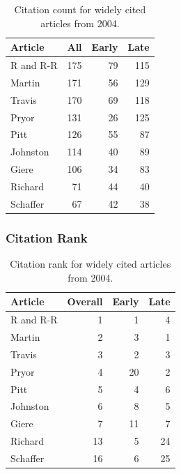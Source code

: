 \documentclass[
  10pt,
  letterpaper,
  DIV=11,
  numbers=noendperiod,
  twoside]{scrartcl}
\begin{document}
\begin{longtable}[]{@{}lrrr@{}}

\caption{\label{tbl-citation-count-2004}Citation count for widely cited
articles from 2004.}

\tabularnewline

\toprule\noalign{}
Article & All & Early & Late \\
\midrule\noalign{}
\endhead
\bottomrule\noalign{}
\endlastfoot
R and R-R & 175 & 79 & 115 \\
Martin & 171 & 56 & 129 \\
Travis & 170 & 69 & 118 \\
Pryor & 131 & 26 & 125 \\
Pitt & 126 & 55 & 87 \\
Johnston & 114 & 40 & 89 \\
Giere & 106 & 34 & 83 \\
Richard & 71 & 44 & 40 \\
Schaffer & 67 & 42 & 38 \\

\end{longtable}

\subsubsection*{Citation Rank}\label{citation-rank-28}

\begin{longtable}[]{@{}lrrr@{}}

\caption{\label{tbl-citation-rank-2004}Citation rank for widely cited
articles from 2004.}

\tabularnewline

\toprule\noalign{}
Article & Overall & Early & Late \\
\midrule\noalign{}
\endhead
\bottomrule\noalign{}
\endlastfoot
R and R-R & 1 & 1 & 4 \\
Martin & 2 & 3 & 1 \\
Travis & 3 & 2 & 3 \\
Pryor & 4 & 20 & 2 \\
Pitt & 5 & 4 & 6 \\
Johnston & 6 & 8 & 5 \\
Giere & 7 & 11 & 7 \\
Richard & 13 & 5 & 24 \\
Schaffer & 16 & 6 & 25 \\

\end{longtable}
\end{document}
